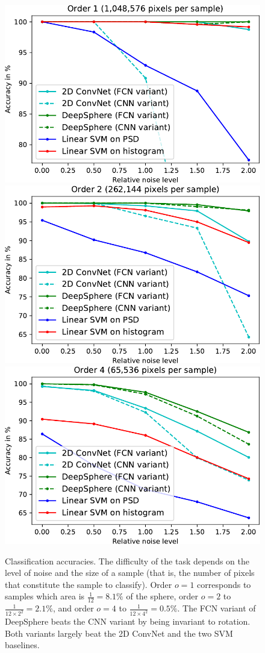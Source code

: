 \documentclass{article} %
\newcommand{\1}{\b{1}}              %
\newcommand{\0}{\b{0}}              %
\begin{document}
\begin{figure}[t!]
	\centering
	\includegraphics[width=0.32\linewidth]{result_order1}
	\hfill
	\includegraphics[width=0.32\linewidth]{result_order2}
	\hfill
	\includegraphics[width=0.32\linewidth]{result_order4}
	\caption{
		Classification accuracies.
		The difficulty of the task depends on the level of noise and the size of a sample (that is, the number of pixels that constitute the sample to classify). Order $o=1$ corresponds to samples which area is $\frac{1}{12}=8.1\%$ of the sphere, order $o=2$ to $\frac{1}{12 \times 2^2} = 2.1\%$, and order $o=4$ to $\frac{1}{12 \times 4^2} = 0.5\%$. 
		The FCN variant of DeepSphere beats the CNN variant by being invariant to rotation. Both variants largely beat the 2D ConvNet and the two SVM baselines.
	}
	\label{fig:results}
\end{figure}
\end{document}
